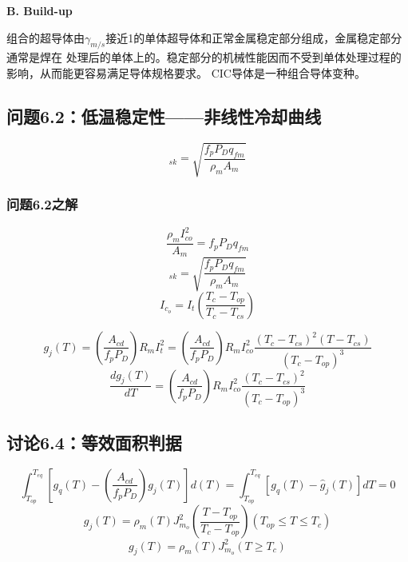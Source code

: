 \textbf{B. Build-up}

组合的超导体由$\gamma_{m/s}$接近1的单体超导体和正常金属稳定部分组成，金属稳定部分通常是焊在
处理后的单体上的。稳定部分的机械性能因而不受到单体处理过程的影响，从而能更容易满足导体规格要求。
CIC导体是一种组合导体变种。

\subsection{问题6.2：低温稳定性——非线性冷却曲线}
\begin{equation}%
[J_{m_o}]_{sk}=\sqrt{\frac{f_pP_Dq_{fm}}{\rho_mA_m}}
\end{equation}

\subsubsection{问题6.2之解}
\begin{equation}%
\frac {\rho_mI_{co}^2}{A_m}=f_pP_Dq_{fm}
\end{equation}
\begin{equation}%
[J_{m_o}]_{sk}=\sqrt{\frac{f_pP_Dq_{fm}}{\rho_mA_m}}
\end{equation}
\begin{equation}%
I_{c_o}=I_t(\frac{T_c-T_{op} }{T_c-T_{cs}})
\end{equation}

\begin{equation}%
g_j(T)=(\frac{A_{cd}}{f_pP_D})R_mI_t^2=(\frac{A_{cd}}{f_pP_D})R_mI_{co}^2\frac{(T_c-T_{cs})^2(T-T_{cs})}{(T_c-T_{op})^3}
\end{equation}
\begin{equation}%
\frac{dg_j(T)}{dT}=(\frac{A_{cd}}{f_pP_D})R_mI_{co}^2\frac{(T_c-T_{cs})^2}{(T_c-T_{op})^3}
\end{equation}



\subsection{讨论6.4：等效面积判据}
\begin{equation}%
\int_{T_{op}}^{T_{eq}}[g_q(T)-(\frac{A_{cd}}{f_pP_D})g_j(T)]d(T)
=\int_{T_{op}}^{T_{eq}}[g_q(T)-\hat{g}_j(T)]dT=0
\end{equation}
\begin{equation}%
g_j(T)=\rho_m(T)J_{m_o}^2(\frac{T-T_{op}}{T_c-T_{op}}) (T_{op}\leq T \leq T_c)
\end{equation}
\begin{equation}%
g_j(T)=\rho_m(T)J_{m_o}^2 (T \geq T_c)
\end{equation}



